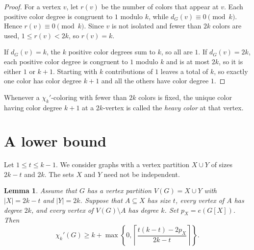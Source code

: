 \documentclass[10pt,a4paper]{amsart}
\newtheorem{lemma}[theorem]{Lemma}
\newcommand{\chik}{\chi_k'}
\begin{document}
\begin{proof}
For a vertex $v$, let $r(v)$ be the number of colors that appear at
$v$. Each positive color degree is congruent to $1$ modulo $k$, while
$d_G(v)\equiv0\pmod{k}$. Hence $r(v)\equiv0\pmod{k}$. Since $v$ is not
isolated and fewer than $2k$ colors are used, $1\leq r(v)<2k$, so
$r(v)=k$.

If $d_G(v)=k$, the $k$ positive color degrees sum to $k$, so all are
$1$. If $d_G(v)=2k$, each positive color degree is congruent to $1$
modulo $k$ and is at most $2k$, so it is either $1$ or $k+1$. Starting
with $k$ contributions of $1$ leaves a total of $k$, so exactly one
color has color degree $k+1$ and all the others have color degree $1$.
\end{proof}

Whenever a $\chi_k'$-coloring with fewer than $2k$ colors is fixed, the
unique color having color degree $k+1$ at a $2k$-vertex is called the
\emph{heavy color} at that vertex.

\section{A lower bound}\label{sec:lower-bound}

Let $1\leq t\leq k-1$. We consider graphs with a vertex partition
$X\cup Y$ of sizes $2k-t$ and $2k$. The sets $X$ and $Y$ need not be
independent.

\begin{lemma}\label{lem:general-lower-bound}
Assume that $G$ has a vertex partition $V(G)=X\cup Y$ with $|X|=2k-t$ and
$|Y|=2k$. Suppose that $A\subseteq X$ has size $t$, every vertex of
$A$ has degree $2k$, and every vertex of $V(G)\setminus A$ has degree
$k$. Set $p_X=e(G[X])$. Then
\begin{equation}\label{eq:general-bound}
\chik(G)\geq
k+\max\left\{0,
\left\lceil\frac{t(k-t)-2p_X}{2k-t}\right\rceil
\right\}.
\end{equation}
\end{lemma}
\end{document}
